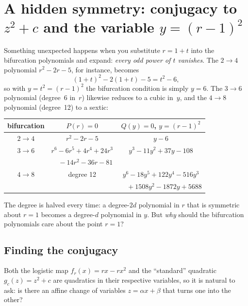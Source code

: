 \documentclass[11pt]{article}
\begin{document}
\section{A hidden symmetry: conjugacy to $z^2+c$ and the variable $y=(r-1)^2$}
\label{sec:conjugacy}

Something unexpected happens when you substitute $r = 1+t$ into the bifurcation
polynomials and expand: \emph{every odd power of $t$ vanishes}.  The $2\to4$
polynomial $r^2-2r-5$, for instance, becomes
\[
(1+t)^2 - 2(1+t) - 5 = t^2 - 6,
\]
so with $y=t^2=(r-1)^2$ the bifurcation condition is simply $y=6$.  The $3\to6$
polynomial (degree~6 in~$r$) likewise reduces to a cubic in~$y$, and the
$4\to 8$ polynomial (degree~12) to a sextic:
\begin{center}
\renewcommand{\arraystretch}{1.3}
\begin{tabular}{ccc}
bifurcation & $P(r)=0$ & $Q(y)=0$, \quad $y=(r-1)^2$ \\\hline
$2\to 4$ & $r^2-2r-5$ & $y-6$ \\[2pt]
$3\to 6$ & $r^6-6r^5+4r^4+24r^3$ & $y^3-11y^2+37y-108$\\
         & $\quad{}-14r^2-36r-81$ & \\[2pt]
$4\to 8$ & degree 12 & $y^6-18y^5+122y^4-516y^3$ \\
         &           & $\quad{}+1508y^2-1872y+5688$
\end{tabular}
\end{center}
The degree is halved every time: a degree-$2d$ polynomial in $r$ that is
symmetric about $r=1$ becomes a degree-$d$ polynomial in $y$.  But
\emph{why} should the bifurcation polynomials care about the point $r=1$?

\subsection{Finding the conjugacy}

Both the logistic map $f_r(x)=rx-rx^2$ and the ``standard'' quadratic
$g_c(z)=z^2+c$ are quadratics in their respective variables, so it is natural
to ask: is there an affine change of variables $z=\alpha x+\beta$ that turns
one into the other?
\end{document}

